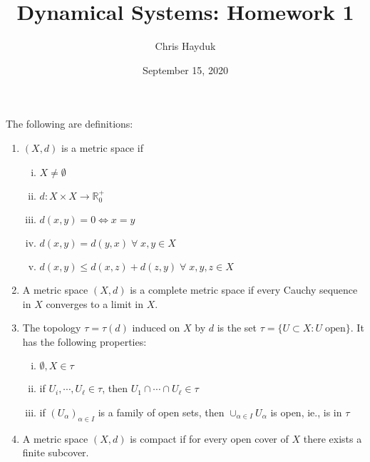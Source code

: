 \documentclass[12pt]{article}
\newenvironment{problem}[2][Problem]{\begin{trivlist}
\item[\hskip \labelsep {\bfseries #1}\hskip \labelsep {\bfseries #2.}]}{\end{trivlist}}
\begin{document}
\title{Dynamical Systems: Homework 1}

\author{Chris Hayduk}
\date{September 15, 2020}

\maketitle

\begin{problem}{1}
\end{problem}

The following are definitions:
\begin{enumerate}[label=(\alph*)]
\item $(X, d)$ is a metric space if
\begin{enumerate}[(i)]
\item $X \neq \emptyset$
\item $d: X \times X \to \mathbb{R}_0^+$
\item $d(x, y) = 0 \iff x = y$
\item $d(x, y) = d(y, x) \; \forall \; x, y \in X$
\item $d(x, y) \leq d(x, z) + d(z, y) \; \forall \; x, y, z \in X$
\end{enumerate}

\item A metric space $(X, d)$ is a complete metric space if every Cauchy sequence in $X$ converges to a limit in $X$.

\item The topology $\tau = \tau(d)$ induced on $X$ by $d$ is the set $\tau = \{U \subset X: U \; \text{open}\}$. It has the following properties:
\begin{enumerate}[(i)]
\item $\emptyset, X \in \tau$
\item if $U_i, \cdots, U_{\ell} \in \tau$, then $U_1 \cap \cdots \cap U_{\ell} \in \tau$
\item if $(U_{\alpha})_{\alpha \in I}$ is a family of open sets, then $\cup_{\alpha \in I} U_{\alpha}$ is open, ie., is in $\tau$
\end{enumerate}

\item A metric space $(X, d)$ is compact if for every open cover of $X$ there exists a finite subcover.

\end{enumerate}

\begin{problem}{2}
\end{problem}
\end{document}
